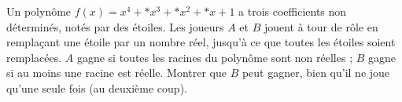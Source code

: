 Un polynôme $f(x) = x^4 + {*}x^3 + {*}x^2 + {*}x + 1$ a trois coefficients non déterminés, notés par des étoiles. Les joueurs $A$ et $B$ jouent à tour de rôle en remplaçant une étoile par un nombre réel, jusqu'à ce que toutes les étoiles soient remplacées. $A$ gagne si toutes les racines du polynôme sont non réelles ; $B$ gagne si au moins une racine est réelle. Montrer que $B$ peut gagner, bien qu'il ne joue qu'une seule fois (au deuxième coup).
